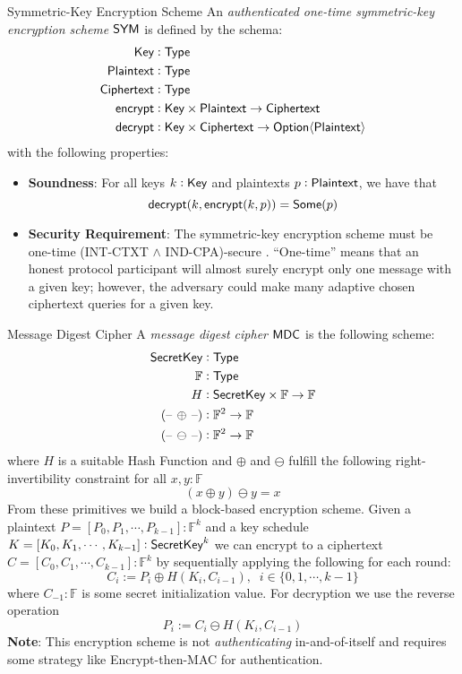 \begin{definitiontoc}{Symmetric-Key Encryption Scheme} \label{def:abstract-symm}
    An \emph{authenticated one-time symmetric-key encryption scheme} ${\textsf{SYM}}$ is defined by the schema:
    \begin{align*}
        {\textsf{Key}} &: {\textsf{Type}} \\
        {\textsf{Plaintext}} &: {\textsf{Type}} \\
        {\textsf{Ciphertext}} &: {\textsf{Type}} \\
        {\textsf{encrypt}} &: {\textsf{Key}} \times {\textsf{Plaintext}} \to {\textsf{Ciphertext}} \\
        {\textsf{decrypt}} &: {\textsf{Key}} \times {\textsf{Ciphertext}} \to {\textsf{Option}}\langle{{\textsf{Plaintext}}}\rangle
    \end{align*}
    with the following properties:
    \begin{itemize}
        \item \textbf{Soundness}: For all keys $k : {\textsf{Key}}$ and plaintexts $p : {\textsf{Plaintext}}$, we have that
            \[{\textsf{decrypt}}(k, {\textsf{encrypt}}(k, p)) = {\textsf{Some}}(p)\]
        \item \textbf{Security Requirement}: The symmetric-key encryption scheme must be one-time (INT-CTXT $\land$ IND-CPA)-secure \cite{BC2000AC}. ``One-time'' means that an honest protocol participant will almost surely encrypt only one message with a given key; however, the adversary could make many adaptive chosen ciphertext queries for a given key.
    \end{itemize}
\end{definitiontoc}

\begin{definitiontoc}{Message Digest Cipher}
    A \emph{message digest cipher} ${\textsf{MDC}}$ is the following scheme:
    \begin{align*}
        {\textsf{SecretKey}} &: {\textsf{Type}} \\
        \mathbb{F} &: {\textsf{Type}} \\
        H          &: {\textsf{SecretKey}} \times \mathbb{F} \to \mathbb{F} \\
        \left({\textrm{--}}\,\oplus\,{\textrm{--}}\right) &: \mathbb{F}^2 \to \mathbb{F} \\
        \left({\textrm{--}}\,\ominus\,{\textrm{--}}\right) &: \mathbb{F}^2 \to \mathbb{F}
    \end{align*}
    where $H$ is a suitable Hash Function and $\oplus$ and $\ominus$ fulfill the following right-invertibility constraint for all $x, y : \mathbb{F}$
    \[(x \oplus y) \ominus y = x\]
    From these primitives we build a block-based encryption scheme. Given a plaintext $P = [P_0, P_1, \cdots, P_{k-1}]: \mathbb{F}^k$ and a key schedule $K = [K_0, K_1, \cdots, K_{k-1}] : {\textsf{SecretKey}}^k$ we can encrypt to a ciphertext $C = [C_0, C_1, \cdots, C_{k-1}] : \mathbb{F}^k$ by sequentially applying the following for each round:
    \[C_i := P_i \oplus H(K_i, C_{i-1}), \;\; i \in \{0,1,\cdots, k-1\}\]
    where $C_{-1}: \mathbb{F}$ is some secret initialization value. For decryption we use the reverse operation
    \[P_i := C_i \ominus H(K_i, C_{i-1})\]
    \textbf{Note}: This encryption scheme is not \emph{authenticating} in-and-of-itself and requires some strategy like Encrypt-then-MAC for authentication.
\end{definitiontoc}

